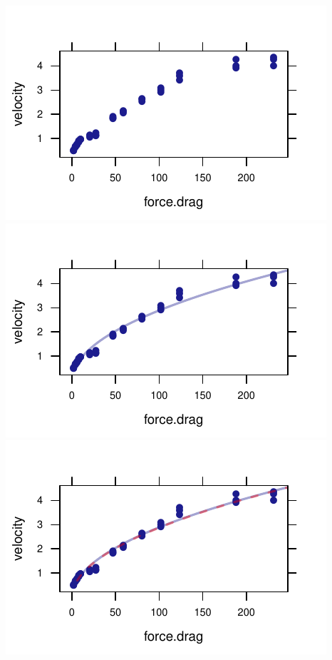 \documentclass[twoside]{book}\usepackage[]{graphicx}\usepackage[]{xcolor}
\makeatletter
\def\maxwidth{ %
  \ifdim\Gin@nat@width>\linewidth
    \linewidth
  \else
    \Gin@nat@width
  \fi
}
\newenvironment{knitrout}{}{} %
\makeatother
\begin{document}
\begin{solution}
\begin{knitrout}
{\centering \includegraphics[width=\maxwidth]{figures/fig-unnamed-chunk-222-1} 
\includegraphics[width=\maxwidth]{figures/fig-unnamed-chunk-222-2} 
\includegraphics[width=\maxwidth]{figures/fig-unnamed-chunk-222-3} 
}
\end{knitrout}
\end{solution}
\end{document}
